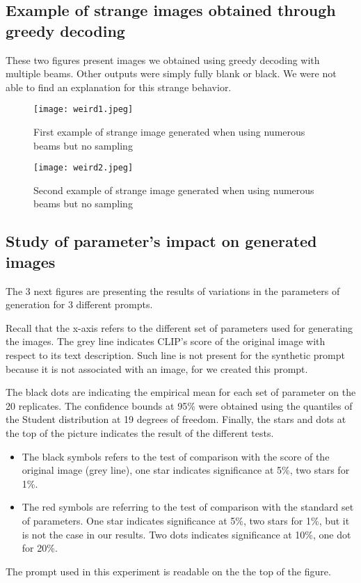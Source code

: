 \documentclass{article}
\begin{document}
\begin{appendix}
\subsection{Example of strange images obtained through greedy decoding}
\label{app:greedy-images}

These two figures present images we obtained using greedy decoding with multiple beams. Other outputs were simply fully blank or black. We were not able to find an explanation for this strange behavior. 

\begin{figure}[h!]
    \centering
    \texttt{[image: weird1.jpeg]}
    \caption{First example of strange image generated when using numerous beams but no sampling}
    \label{fig:gen-weird1}
\end{figure}

\begin{figure}[h!]
    \centering
    \texttt{[image: weird2.jpeg]}
    \caption{Second example of strange image generated when using numerous beams but no sampling}
    \label{fig:gen-weird2}
\end{figure}

\subsection{Study of parameter's impact on generated images}
\label{app:other-gen-param}

The 3 next figures are presenting the results of variations in the parameters of generation for 3 different prompts.

Recall that the x-axis refers to the different set of parameters used for generating the images. The grey line indicates CLIP's score of the original image with respect to its text description. Such line is not present for the synthetic prompt because it is not associated with an image, for we created this prompt. 

The black dots are indicating the empirical mean for each set of parameter on the 20 replicates. The confidence bounds at 95\% were obtained using the quantiles of the Student distribution at 19 degrees of freedom. 
Finally, the stars and dots at the top of the picture indicates the result of the different tests. 
\begin{itemize}
    \item The black symbols refers to the test of comparison with the score of the original image (grey line), one star indicates significance at 5\%, two stars for 1\%.
    \item  The red symbols are referring to the test of comparison with the standard set of parameters. One star indicates significance at 5\%, two stars for 1\%, but it is not the case in our results. Two dots indicates significance at 10\%, one dot for 20\%. 
\end{itemize}
The prompt used in this experiment is readable on the the top of the figure.


\end{appendix}
\end{document}

